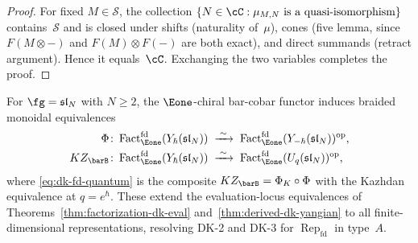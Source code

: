 \begin{proof}
For fixed $M \in \mathcal{S}$, the collection
$\{N \in \cC : \mu_{M,N} \text{ is a quasi-isomorphism}\}$
contains~$\mathcal{S}$ and is closed under shifts (naturality of~$\mu$),
cones (five lemma, since $F(M \otimes -)$ and
$F(M) \otimes F(-)$ are both exact), and direct summands
(retract argument).  Hence it equals~$\cC$.
Exchanging the two variables completes the proof.
\end{proof}

\begin{theorem}
\label{thm:dk-fd-typeA}
For $\fg = \mathfrak{sl}_N$ with $N \ge 2$, the $\Eone$-chiral
bar-cobar functor induces braided monoidal equivalences
\begin{align}
\Phi&\colon
\operatorname{Fact}_{\Eone}^{\mathrm{fd}}(Y_\hbar(\mathfrak{sl}_N))
\;\xrightarrow{\;\sim\;}\;
\operatorname{Fact}_{\Eone}^{\mathrm{fd}}
  (Y_{-\hbar}(\mathfrak{sl}_N))^{\mathrm{op}},
  \label{eq:dk-fd-yangian}\\
KZ_{\barB}&\colon
\operatorname{Fact}_{\Eone}^{\mathrm{fd}}(Y_\hbar(\mathfrak{sl}_N))
\;\xrightarrow{\;\sim\;}\;
\operatorname{Fact}_{\Eone}^{\mathrm{fd}}
  (U_q(\mathfrak{sl}_N))^{\mathrm{op}},
  \label{eq:dk-fd-quantum}
\end{align}
where \eqref{eq:dk-fd-quantum} is the composite
$KZ_{\barB} = \Phi_K \circ \Phi$ with the Kazhdan equivalence
at $q = e^\hbar$.
These extend the evaluation-locus equivalences of
Theorems~\textup{\ref{thm:factorization-dk-eval}}
and~\textup{\ref{thm:derived-dk-yangian}} to all finite-dimensional
representations, resolving DK-2 and DK-3 for
$\operatorname{Rep}_{\mathrm{fd}}$ in type~$A$.
\end{theorem}

